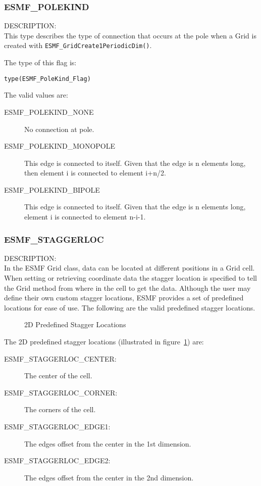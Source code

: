 \subsubsection{ESMF\_POLEKIND}
\label{const:polekind}

{\sf DESCRIPTION:\\}
This type describes the type of connection that occurs at the pole when a Grid is 
created with {\tt ESMF\_GridCreate1PeriodicDim()}.

The type of this flag is:

{\tt type(ESMF\_PoleKind\_Flag)}

The valid values are:
\begin{description}
\item [ESMF\_POLEKIND\_NONE] No connection at pole.

\item [ESMF\_POLEKIND\_MONOPOLE] This edge is connected to itself. Given
that the edge is n elements long, then element i is connected to
element i+n/2.

\item [ESMF\_POLEKIND\_BIPOLE] This edge is connected to itself. Given
that the edge is n elements long, element i is connected to element n-i-1.
\end{description}


\subsubsection{ESMF\_STAGGERLOC}
\label{const:staggerloc}

 {\sf DESCRIPTION:\\}
 In the ESMF Grid class, data can be located at different positions in a
 Grid cell.  When setting or retrieving coordinate data the stagger location is
 specified to tell the Grid method  from where in the cell to get the data. 
 Although the user may define their own custom stagger locations, 
 ESMF provides a set of predefined locations for ease of use. The
following are the valid predefined stagger locations. 

\medskip

\begin{center}
\begin{figure}
\center
{}
\caption{2D Predefined Stagger Locations}
\label{fig:gridstaggerloc2d}
\end{figure}
\end{center}

The 2D predefined stagger locations (illustrated in figure~\ref{fig:gridstaggerloc2d}) are:\\
\begin{description}
\item [ESMF\_STAGGERLOC\_CENTER:] The center of the cell.
\item [ESMF\_STAGGERLOC\_CORNER:] The corners of the cell.
\item [ESMF\_STAGGERLOC\_EDGE1:] The edges offset from the center in the 1st dimension.
\item [ESMF\_STAGGERLOC\_EDGE2:] The edges offset from the center in the 2nd dimension.
\end{description}

